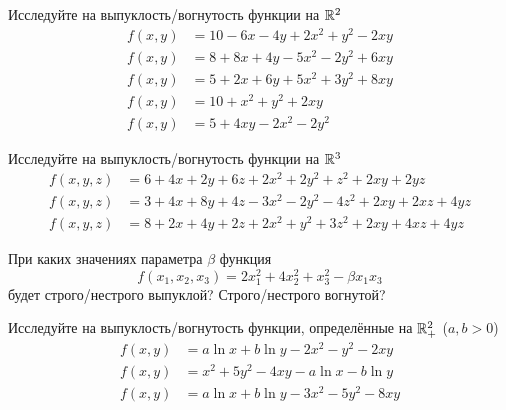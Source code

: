 
\begin{exercise}
Исследуйте на выпуклость/вогнутость функции на \({\mathbb R}^2\)
\begin{align*}
	f(x,y) &= 10-6x-4y+2x^2+y^2-2xy \\
	f(x,y) &= 8+8x+4y-5x^2-2y^2+6xy \\
	f(x,y) &= 5+2x+6y+5x^2+3y^2+8xy \\
	f(x,y) &= 10+x^2+y^2+2xy \\
	f(x,y) &= 5+4xy-2x^2-2y^2
\end{align*}
\end{exercise}

\begin{exercise}
Исследуйте на выпуклость/вогнутость функции на \({\mathbb R}^3\)
\begin{align*}
	f(x,y,z) &= 6+4x+2y+6z+2x^2+2y^2+z^2+2xy+2yz \\
	f(x,y,z) &= 3+4x+8y+4z-3x^2-2y^2-4z^2+2xy+2xz+4yz\\
	f(x,y,z) &= 8+2x+4y+2z+2x^2+y^2+3z^2+2xy+4xz+4yz
\end{align*}
\end{exercise}

\begin{exercise}
При каких значениях параметра $\beta$ функция
\[
	f(x_1,x_2,x_3)=2x_1^2+4x_2^2+x_3^2-\beta x_1x_3
\]
будет строго/нестрого выпуклой? Строго/нестрого вогнутой?
\end{exercise}

\begin{exercise}
Исследуйте на выпуклость/вогнутость функции, определённые на 
\({\mathbb R}^2_+\) (\(a,b>0\))
\begin{align*}
	f(x,y) &= a\ln x+b\ln y-2x^2-y^2-2xy \\
	f(x,y) &= x^2+5y^2-4xy-a\ln x-b\ln y \\
	f(x,y) &= a\ln x+b\ln y -3x^2-5y^2-8xy
\end{align*}
\end{exercise}